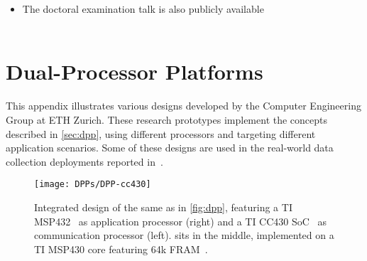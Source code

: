 \begin{subappendices}
\begin{itemize}
	\item
	The doctoral examination talk is also publicly available\\[5pt]
	\\[-8pt]

\end{itemize}

%

\newpage
\section{Dual-Processor Platforms}
\label{append:dpp}

This appendix illustrates various \DPP designs developed by the Computer Engineering Group at ETH Zurich.
These research prototypes implement the \DPP concepts described in \cref{sec:dpp}, using different processors and targeting different application scenarios. Some of these designs are used in the real-world data collection deployments reported \eg in~\cite{weber2019decade,meyer2019IPSN}.

\vspace{1cm}

\begin{figure}[h]
	\centering
	\texttt{[image: DPPs/DPP-cc430]}
	\caption{Integrated design of the same \DPP as in \cref{fig:dpp}, featuring a TI MSP432~\cite{msp432} as application processor (right) and a TI CC430 SoC~\cite{CC430F6137} as communication processor (left). \bolt sits in the middle, implemented on a TI MSP430 core featuring
64k FRAM~\cite{msp432FR}.}
	\label{fig:dpp-cc430}
\end{figure}


\end{subappendices}
